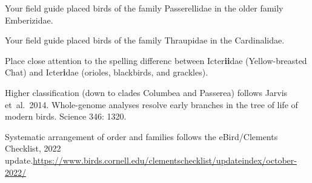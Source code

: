 \documentclass[10pt]{article}
\begin{document}
Your field guide placed birds of the family Passerellidae in the older family Emberizidae.

Your field guide placed birds of the family Thraupidae in the Cardinalidae. 

Place close attention to the spelling differenc between Icter\textbf{ii}dae (Yellow-breasted Chat) and Icter\textbf{i}dae (orioles, blackbirds, and grackles).


\bigskip

Higher classification (down to clades Columbea and Passerea) follows Jarvis et~al.~2014. Whole-genome analyses resolve early branches in the tree of life of modern birds. Science 346: 1320.

\bigskip

Systematic arrangement of order and families follows the eBird/Clements Checklist, 2022 update.\newline \url{https://www.birds.cornell.edu/clementschecklist/updateindex/october-2022/}
\end{document}
